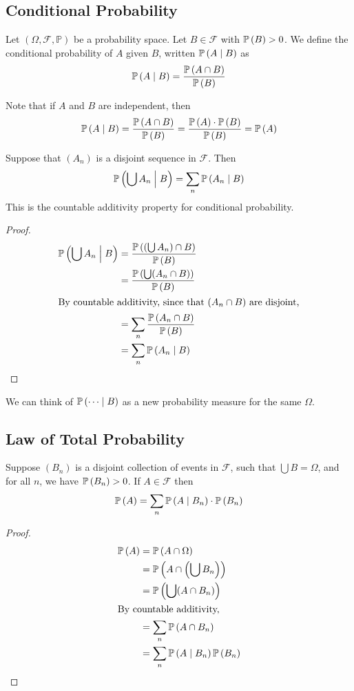 \documentclass{article}
\begin{document}
\subsection{Conditional Probability}
\begin{definition}
    Let $(\Omega, \mathcal F, \mathbb P)$ be a probability space. Let $B \in \mathcal F$ with $\mathbb{P}\left({B}\right) > 0$. We define the conditional probability of $A$ given $B$, written $\mathbb{P}\left({A \mid B}\right)$ as
    \[ \mathbb{P}\left({A \mid B}\right) = \frac{\mathbb{P}\left({A \cap B}\right)}{\mathbb{P}\left({B}\right)} \]
\end{definition}
\noindent Note that if $A$ and $B$ are independent, then
\[ \mathbb{P}\left({A \mid B}\right) = \frac{\mathbb{P}\left({A \cap B}\right)}{\mathbb{P}\left({B}\right)} = \frac{\mathbb{P}\left({A}\right) \cdot \mathbb{P}\left({B}\right)}{\mathbb{P}\left({B}\right)} = \mathbb{P}\left({A}\right) \]
\begin{claim}
    Suppose that $(A_n)$ is a disjoint sequence in $\mathcal F$. Then
    \[ \mathbb{P}\left({\bigcup A_n \mathrel{\Big|} B}\right) = \sum_{n} \mathbb{P}\left({A_n \mid B}\right) \]
    This is the countable additivity property for conditional probability.
\end{claim}
\begin{proof}
    \begin{align*}
        \mathbb{P}\left({\bigcup A_n \mathrel{\Big|} B}\right) & = \frac{\mathbb{P}\left({(\bigcup A_n) \cap B}\right)}{\mathbb{P}\left({B}\right)} \\
                                             & = \frac{\mathbb{P}\left({\bigcup (A_n \cap B)}\right)}{\mathbb{P}\left({B}\right)} \\
        \intertext{By countable additivity, since that $(A_n \cap B)$ are disjoint,}
                                             & = \sum_n \frac{\mathbb{P}\left({A_n \cap B}\right)}{\mathbb{P}\left({B}\right)}    \\
                                             & = \sum_n \mathbb{P}\left({A_n \mid B}\right)
    \end{align*}
\end{proof}
\noindent We can think of $\mathbb{P}\left({\dots \mid B}\right)$ as a new probability measure for the same $\Omega$.

\subsection{Law of Total Probability}
\begin{claim}
    Suppose $(B_n)$ is a disjoint collection of events in $\mathcal F$, such that $\bigcup B = \Omega$, and for all $n$, we have $\mathbb{P}\left({B_n}\right) > 0$. If $A \in \mathcal F$ then
    \[ \mathbb{P}\left({A}\right) = \sum_n \mathbb{P}\left({A \mid B_n}\right) \cdot \mathbb{P}\left({B_n}\right) \]
\end{claim}
\begin{proof}
    \begin{align*}
        \mathbb{P}\left({A}\right) & = \mathbb{P}\left({A \cap \Omega}\right)                   \\
                 & = \mathbb{P}\left({A \cap \left(\bigcup B_n\right)}\right) \\
                 & = \mathbb{P}\left({\bigcup(A \cap B_n)}\right)             \\
        \intertext{By countable additivity,}
                 & = \sum_n \mathbb{P}\left({A \cap B_n}\right)               \\
                 & = \sum_n \mathbb{P}\left({A \mid B_n}\right) \mathbb{P}\left({B_n}\right)
    \end{align*}
\end{proof}
\end{document}
